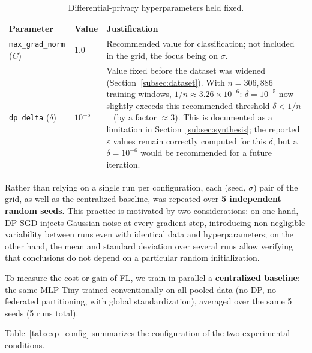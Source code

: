 \documentclass{article}
\begin{document}
\begin{table}[h!]
  \centering
  \caption{Differential-privacy hyperparameters held fixed.}
  \label{tab:dp_params_justif}
  \begin{tabular}{llp{6cm}}
    \toprule
    Parameter & Value & Justification \\
    \midrule
    \texttt{max\_grad\_norm} ($C$) & 1.0 & Recommended value for
    classification; not included in the grid, the focus being on $\sigma$. \\
    \texttt{dp\_delta} ($\delta$) & $10^{-5}$ & Value fixed before the dataset was
    widened (Section~\ref{subsec:dataset}). With $n = 306{,}886$
    training windows, $1/n \approx 3.26 \times 10^{-6}$: $\delta = 10^{-5}$ now
    slightly exceeds this recommended threshold $\delta < 1/n$~\cite{dwork2014foundations}
    (by a factor $\approx 3$). This is documented as a limitation in
    Section~\ref{subsec:synthesis}; the reported $\varepsilon$ values remain
    correctly computed for this $\delta$, but a $\delta = 10^{-6}$ would be
    recommended for a future iteration. \\
    \bottomrule
  \end{tabular}
\end{table}

Rather than relying on a single run per configuration, each (seed, $\sigma$) pair
of the grid, as well as the centralized baseline, was repeated over \textbf{5
independent random seeds}. This practice is motivated by two considerations: on
one hand, DP-SGD injects Gaussian noise at every gradient step, introducing
non-negligible variability between runs even with identical data and
hyperparameters; on the other hand, the mean and standard deviation over several
runs allow verifying that conclusions do not depend on a particular random
initialization.

To measure the cost or gain of FL, we train in parallel a \textbf{centralized
baseline}: the same MLP Tiny trained conventionally on all pooled data (no DP, no
federated partitioning, with global standardization), averaged over the same 5
seeds (5 runs total).

Table~\ref{tab:exp_config} summarizes the configuration of the two experimental
conditions.
\end{document}
